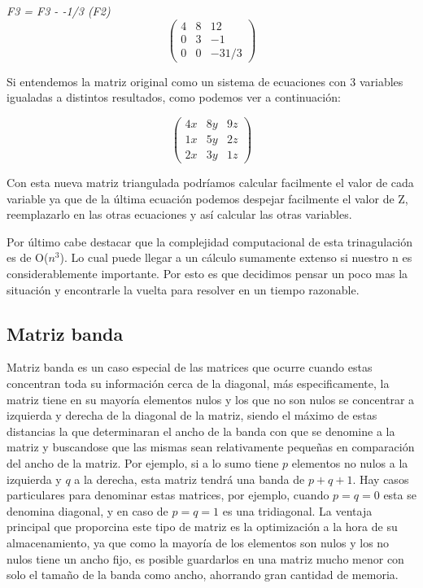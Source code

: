\emph{F3 = F3 - -1/3 (F2) } 
\[ \left( \begin{array}{ccc}
4 & 8 & 12 \\
0 & 3 & -1 \\
0 & 0 & -31/3 \end{array} \right)\] 

Si entendemos la matriz original como un sistema de ecuaciones con 3 variables igualadas a distintos resultados, como podemos ver a continuación:

\[ \left( \begin{array}{ccc}
4x & 8y & 9z \\
1x & 5y & 2z \\
2x & 3y & 1z \end{array} \right)\] 

Con esta nueva matriz triangulada podríamos calcular facilmente el valor de cada variable ya que de la última ecuación podemos despejar facilmente el valor de Z, reemplazarlo en las otras ecuaciones y así calcular las otras variables.



Por último cabe destacar que la complejidad computacional de esta trinagulación es de O($n^3$). Lo cual puede llegar a un cálculo sumamente extenso si nuestro n es considerablemente importante. Por esto es que decidimos pensar un poco mas la situación y encontrarle la vuelta para resolver en un tiempo razonable.

\subsection{Matriz banda}

Matriz banda es un caso especial de las matrices que ocurre cuando estas concentran toda su información cerca de la diagonal, más especificamente, la matriz tiene en su mayoría elementos nulos y los que no son nulos se concentrar a izquierda y derecha de la diagonal de la matriz, siendo el máximo de estas distancias la que determinaran el ancho de la banda con que se denomine a la matriz y buscandose que las mismas sean relativamente pequeñas en comparación del ancho de la matriz. Por ejemplo, si a lo sumo tiene $p$ elementos no nulos a la izquierda y $q$ a la derecha, esta matriz tendrá una banda de $p+q+1$. Hay casos particulares para denominar estas matrices, por ejemplo, cuando $p = q = 0$ esta se denomina diagonal, y en caso de $p = q = 1$  es una tridiagonal.
La ventaja principal que proporcina este tipo de matriz es la optimización a la hora de su almacenamiento, ya que como la mayoría de los elementos son nulos y los no nulos tiene un ancho fijo, es posible guardarlos en una matriz mucho menor con solo el tamaño de la banda como ancho, ahorrando gran cantidad de memoria.

